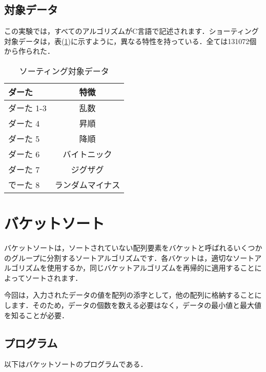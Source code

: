 \documentclass[a4j, titlepage]{jarticle}
\begin{document}
        \subsection{対象データ}
            この実験では，すべてのアルゴリズムがC言語で記述されます．ショーティング対象データは，表(\ref{tab:data})に示すように，異なる特性を持っている．全ては131072個から作られた．
            \begin{table}[tbh]
                \caption{ソーティング対象データ}
                \label{tab:data}
                \begin{center}
                    \begin{tabular}{lc}
                        \hline
                        ダーた & 特徴 \\ \hline\hline
                        ダーた 1-3 & 乱数\\ 
                        ダーた 4 &  昇順\\ 
                        ダーた 5 &  降順\\ 
                        ダーた 6 &  バイトニック\\ 
                        ダーた 7 &  ジグザグ\\ 
                        でーた 8 & ランダムマイナス\\ \hline
                    \end{tabular}
                \end{center}
            \end{table}

    \section{バケットソート}
        バケットソートは，ソートされていない配列要素をバケットと呼ばれるいくつかのグループに分割するソートアルゴリズムです．各バケットは，適切なソートアルゴリズムを使用するか，同じバケットアルゴリズムを再帰的に適用することによってソートされます．

        今回は，入力されたデータの値を配列の添字として，他の配列に格納することにします．そのため，データの個数を数える必要はなく，データの最小値と最大値を知ることが必要．

        \subsection{プログラム}
            以下はバケットソートのプログラムである．
            
\end{document}
